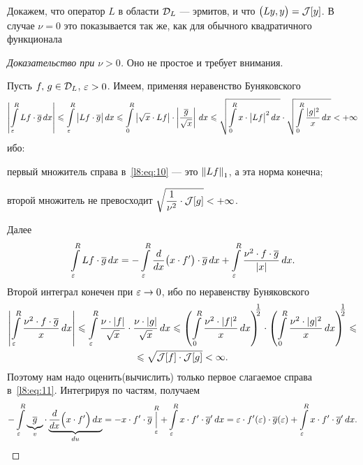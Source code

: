 Докажем, что оператор $L$ в области $\mathcal{D}_L$ --- эрмитов, и что $\big(Ly,y\big)=\mathcal{J}[y]$. В случае $\nu=0$ это показывается так же, как для обычного квадратичного функционала
\begin{proof}[Доказательство при $\nu>0$]
	Оно не простое и требует внимания.
	
	Пусть $f,\,g\in\mathcal{D}_L$, $\varepsilon>0$. Имеем, применяя неравенство Буняковского
	\begin{equation}\label{l8:eq:10}
		\left|\int\limits_{\varepsilon}^R Lf\cdot\overline{g}\,dx\right|\leqslant\int\limits_{\varepsilon}^R\big|Lf\cdot\overline{g}\big|\,dx\leqslant\int\limits_{0}^R\big|\sqrt{x}\cdot Lf\big|\cdot\left|\frac{\overline{g}}{\sqrt{x}}\right|\,dx\leqslant\sqrt{\int\limits_{0}^R x\cdot\big|Lf\big|^2\,dx}\cdot\sqrt{\int\limits_{0}^R \frac{|g|^2}{x}\,dx}<+\infty
	\end{equation}
	ибо:
	\begin{enumeraterm}
		\item первый множитель справа в~\eqref{l8:eq:10} --- это $\left\|Lf\right\|_1$, а эта норма конечна;
		\item второй множитель не превосходит $\sqrt{\dfrac{1}{\nu^2}\cdot\mathcal{J}[g]}<+\infty$.
	\end{enumeraterm}
	Далее
	\begin{equation}\label{l8:eq:11}
		\hfill\int\limits_{\eps}^R Lf\cdot\overline{g}\,dx=-\int\limits_{\eps}^R\der{}{x}\big(x\cdot f'\big)\cdot\overline{g}\,dx+\int\limits_{\eps}^R\frac{\nu^2\cdot f\cdot\overline{g}}{|x|}\,dx.\hfill
	\end{equation}
	Второй интеграл конечен при $\varepsilon\to0$, ибо по неравенству Буняковского
	\begin{multline}\label{l8:eq:12}
		\left|\int\limits_{\varepsilon}^R\frac{\nu^2\cdot f\cdot\overline{g}}{x}\,dx\right|\leqslant\int\limits_{\varepsilon}^R\frac{\nu\cdot|f|}{\sqrt{x}}\cdot\frac{\nu\cdot|g|}{\sqrt{x}}\,dx\leqslant\left(\int\limits_{0}^R\frac{\nu^2\cdot|f|^2}{x}\,dx\right)^{\!\!\!\textstyle\frac{1}{2}}\cdot\left(\int\limits_{0}^R\frac{\nu^2\cdot|g|^2}{x}\,dx\right)^{\!\!\!\textstyle\frac{1}{2}}\leqslant\\
		\leqslant\sqrt{\mathcal{J}[f]\cdot\mathcal{J}[g]}<\infty.
	\end{multline}
	Поэтому нам надо оценить(вычислить) только первое слагаемое справа в~\eqref{l8:eq:11}. Интегрируя по частям, получаем
	\begin{equation}\label{l8:eq:13}
		-\int\limits_{\eps}^R\underbrace{\overline{g}}_{v}\cdot\underbrace{\der{}{x}\Big(x\cdot f'\Big)\,dx}_{du}=-x\cdot f'\cdot\overline{g}\mathop{\Big|}\limits_{\eps}^R+\int\limits_{\eps}^R x\cdot f'\cdot\overline{g}'\,dx=\eps\cdot f'(\eps)\cdot\overline{g}(\eps)+\int\limits_{\eps}^R x\cdot f'\cdot\overline{g}'\,dx.

\end{equation}
\end{proof}

